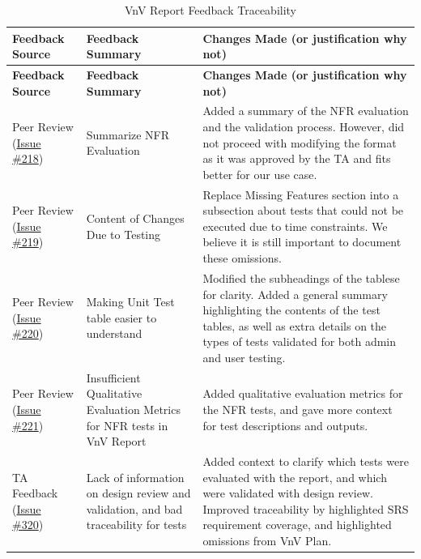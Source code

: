 \documentclass{article}
\begin{document}
\begin{longtable}{|>{\raggedright\arraybackslash}p{}|>{\raggedright\arraybackslash}p{}|>{\raggedright\arraybackslash}p{}|}
\caption{VnV Report Feedback Traceability}
\label{tab:vnv-feedback-traceability}\\
\hline
\textbf{Feedback Source} & \textbf{Feedback Summary} & \textbf{Changes Made (or justification why not)} \\
\hline
\endfirsthead

\hline
\textbf{Feedback Source} & \textbf{Feedback Summary} & \textbf{Changes Made (or justification why not)} \\
\hline
\endhead

\hline
\endfoot

\hline
\endlastfoot

Peer Review (\href{https://github.com/VirochaanRG/MES-Event-Management-System/issues/218}{Issue \#218}) & Summarize NFR Evaluation & Added a summary of the NFR evaluation and the validation process. However, did not proceed with modifying the format as it was approved by the TA and fits better for our use case.\\
\hline
Peer Review (\href{https://github.com/VirochaanRG/MES-Event-Management-System/issues/219}{Issue \#219}) &  Content of Changes Due to Testing & Replace Missing Features section into a subsection about tests that could not be executed due to time constraints. We believe it is still important to document these omissions.\\
\hline
Peer Review (\href{https://github.com/VirochaanRG/MES-Event-Management-System/issues/220}{Issue \#220}) & Making Unit Test table easier to understand & Modified the subheadings of the tablese for clarity. Added a general summary highlighting the contents of the test tables, as well as extra details on the types of tests validated for both admin and user testing.\\
\hline
Peer Review (\href{https://github.com/VirochaanRG/MES-Event-Management-System/issues/221}{Issue \#221}) & Insufficient Qualitative Evaluation Metrics for NFR tests in VnV Report  & Added qualitative evaluation metrics for the NFR tests, and gave more context for test descriptions and outputs.\\
\hline
TA Feedback (\href{https://github.com/VirochaanRG/MES-Event-Management-System/issues/320}{Issue \#320}) & Lack of information on design review and validation, and bad traceability for tests & Added context to clarify which tests were evaluated with the report, and which were validated with design review. Improved traceability by highlighted SRS requirement coverage, and highlighted omissions from VnV Plan.\\
\hline
\end{longtable}
\end{document}

